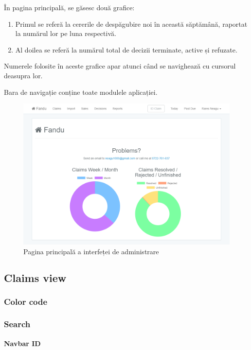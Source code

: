 	În pagina principală, se găsesc două grafice:
	\begin{enumerate}
		\item Primul se referă la cererile de despăgubire noi în această săptămână, raportat la numărul lor pe luna respectivă.
		\item Al doilea se referă la numărul total de decizii terminate, active și refuzate.
	\end{enumerate}

	Numerele folosite în aceste grafice apar atunci când se navighează cu cursorul deasupra lor.

	Bara de navigație conține toate modulele aplicației.

	\begin{figure}
		\includegraphics[width=\linewidth]{../imagini/home_page.png}
		\caption{Pagina principală a interfeței de administrare}
		\label{fig:home_page}
	\end{figure}

	\subsection{Claims view}
		\subsubsection{Color code}
		\subsubsection{Search}
			\paragraph{Navbar ID}
